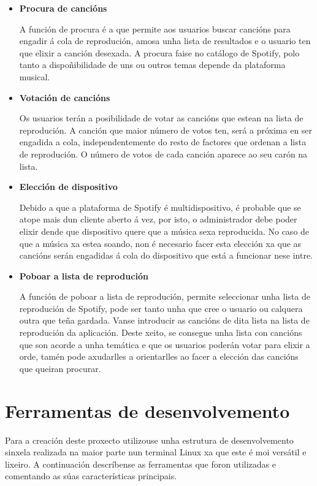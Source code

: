 \begin{itemize}
	\item \textbf{Procura de cancións}

		A función de procura é a que permite aos usuarios buscar cancións para engadir á cola de reprodución, amosa unha lista de resultados e o usuario ten que elixir a canción desexada. A procura faise no catálogo de Spotify, polo tanto a dispoñibilidade de uns ou outros temas depende da plataforma musical.

	\item \textbf{Votación de cancións}
		
		Os usuarios terán a posibilidade de votar as cancións que estean na lista de reprodución. A canción que maior número de votos ten, será a próxima en ser engadida a cola, independentemente do resto de factores que ordenan a lista de reprodución. O número de votos de cada canción aparece ao seu carón na lista.

	\item \textbf{Elección de dispositivo}

		Debido a que a plataforma de Spotify é multidispositivo, é probable que se atope mais dun cliente aberto á vez, por isto, o administrador debe poder elixir dende que dispositivo quere que a música sexa reproducida. No caso de que a música xa estea soando, non é necesario facer esta elección xa que as cancións serán engadidas á cola do dispositivo que está a funcionar nese intre.

	\item \textbf{Poboar a lista de reprodución}

		A función de poboar a lista de reprodución, permite seleccionar unha lista de reprodución de Spotify, pode ser tanto unha que cree o usuario ou calquera outra que teña gardada. Vanse introducir as cancións de dita lista na lista de reprodución da aplicación. Deste xeito, se consegue unha lista con cancións que son acorde a unha temática e que os usuarios poderán votar para elixir a orde, tamén pode axudarlles a orientarlles ao facer a elección das cancións que queiran procurar.
\end{itemize}

\section{Ferramentas de desenvolvemento}
\label{sec:ferramentas_desenvolvemento}

Para a creación deste proxecto utilizouse unha estrutura de desenvolvemento sinxela realizada na maior parte nun terminal Linux xa que este é moi versátil e lixeiro. A continuación descríbense as ferramentas que foron utilizadas e comentando as súas características principais.

